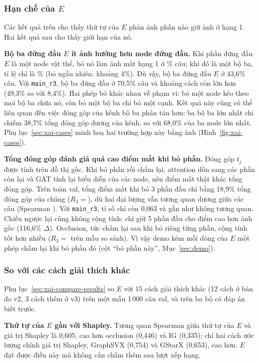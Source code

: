 \subsubsection{Hạn chế của $E$}\label{sec:xai-findings}
Các kết quả trên cho thấy thứ tự của $E$ phản ánh phần nào giữ ảnh ở hạng 1. Hai kết quả sau cho thấy giới hạn của nó.

\textbf{Bộ ba đứng đầu $E$ ít ảnh hưởng hơn node đứng đầu.} Khi phần đứng đầu $E$ là một node vật thể, bỏ nó làm ảnh mất hạng
1 ở \% câu; khi đó là một bộ ba, tỉ lệ chỉ là \% (bỏ ngẫu nhiên: khoảng 4\%). Dù vậy, bộ
ba đứng đầu $E$ ở 43,6\% câu. Với \texttt{main\_r3}, bộ ba đứng đầu ở 70,5\% câu và khoảng cách còn lớn hơn (49,3\% so với
8,4\%). Hai phép bỏ khác nhau về phạm vi: bỏ một node kéo theo mọi bộ ba chứa nó, còn bỏ một bộ ba chỉ bỏ một cạnh. Kết quả
này cũng có thể liên quan đến việc đóng góp của kênh bộ ba phân tán hơn: ba bộ ba lớn nhất chỉ chiếm 38,7\% tổng đóng góp
dương của kênh, so với 68,0\% của ba node lớn nhất. Phụ lục~\ref{sec:xai-cases} minh hoạ hai trường hợp này bằng ảnh
(Hình~\ref{fig:xai-cases}).

\textbf{Tổng đóng góp đánh giá quá cao điểm mất khi bỏ phần.} Đóng góp $t_j$ được tính trên đồ thị gốc. Khi bỏ phần rồi chấm
lại, attention dồn sang các phần còn lại và GAT tính lại biểu diễn của các node, nên điểm mất thật khác tổng đóng góp. Trên
toàn val, tổng điểm mất khi bỏ 3 phần đầu chỉ bằng 18,9\% tổng đóng góp của chúng ($R_3={}$), dù hai
đại lượng vẫn tương quan dương giữa các câu (Spearman ). Với \texttt{main\_r3}, tỉ số chỉ còn 0,063 và
gần như không tương quan. Chiều ngược lại cũng không cộng tính: chỉ giữ 5 phần đầu cho điểm cao hơn ảnh gốc (116,6\%
$\Delta$). Occlusion, tức chấm lại sau khi bỏ riêng từng phần, cộng tính tốt hơn nhiều ($R_3={}$ trên
mẫu so sánh). Vì vậy demo kèm mỗi dòng của $E$ một phép chấm lại khi bỏ phần đó (cột ``bỏ phần này'', Mục~\ref{sec:demo}).

\subsubsection{So với các cách giải thích khác}\label{sec:xai-compare}
Phụ lục~\ref{sec:xai-compare-results} so $E$ với 15 cách giải thích khác (12 cách ở bản đo v2, 3 cách thêm ở v3) trên một
mẫu 1\,000 câu val, và trên ba bộ có đáp án biết trước.

\textbf{Thứ tự của $E$ gần với Shapley.} Tương quan Spearman giữa thứ tự của $E$ và giá trị Shapley là 0,605, cao hơn
occlusion (0,446) và IG (0,335); chỉ hai cách ước lượng chính giá trị Shapley, GraphSVX (0,754) và GStarX (0,653), cao hơn.
$E$ đạt được điều này mà không cần chấm thêm sau lượt xếp hạng.

